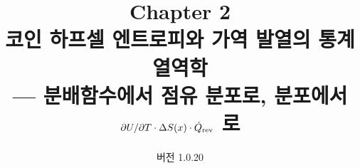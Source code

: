 

\title{\textbf{\LARGE Chapter 2}\\[0.35em]\Large 코인 하프셀 엔트로피와 가역 발열의 통계열역학\\[0.2em]\large — 분배함수에서 점유 분포로, 분포에서 $\partial U/\partial T\cdot\Delta S(x)\cdot\dot Q_{\mathrm{rev}}$ 로}
\author{}
\date{\normalsize 버전 1.0.20}


\maketitle
















